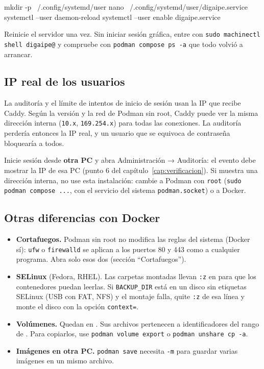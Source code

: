 \begin{codigo}
mkdir -p ~/.config/systemd/user
nano ~/.config/systemd/user/digaipe.service
systemctl --user daemon-reload
systemctl --user enable digaipe.service
\end{codigo}

\begin{comprobar}
	Reinicie el servidor una vez. Sin iniciar sesión gráfica, entre con
	\texttt{sudo machinectl shell digaipe@} y compruebe con \texttt{podman compose ps -a} que todo
	volvió a arrancar.
\end{comprobar}

\subsection{IP real de los usuarios}
\label{sec:podman-ip}

La auditoría y el límite de intentos de inicio de sesión usan la IP que recibe Caddy. Según la
versión y la red de Podman sin root, Caddy puede ver la misma dirección interna
(\texttt{10.x}, \texttt{169.254.x}) para todas las conexiones. La auditoría perdería entonces la
IP real, y un usuario que se equivoca de contraseña bloquearía a todos.

\begin{aviso}
	Inicie sesión desde \textbf{otra PC} y abra Administración → Auditoría: el evento debe mostrar
	la IP de esa PC (punto 6 del capítulo~\ref{cap:verificacion}). Si muestra una dirección
	interna, no use esta instalación: cambie a Podman con \texttt{root}
	(\texttt{sudo podman compose ...}, con el servicio del sistema \texttt{podman.socket}) o a
	Docker.
\end{aviso}

\subsection{Otras diferencias con Docker}

\begin{itemize}
	\item \textbf{Cortafuegos.} Podman sin root no modifica las reglas del sistema (Docker sí):
	      \texttt{ufw} o \texttt{firewalld} se aplican a los puertos 80 y 443 como a cualquier
	      programa. Abra solo esos dos (sección ``Cortafuegos'').
	\item \textbf{SELinux} (Fedora, RHEL). Las carpetas montadas llevan \texttt{:z} en
	       para que los contenedores puedan leerlas. Si \texttt{BACKUP\_DIR}
	      está en un disco sin etiquetas SELinux (USB con FAT, NFS) y el montaje falla, quite
	      \texttt{:z} de esa línea y monte el disco con la opción \texttt{context=}.
	\item \textbf{Volúmenes.} Quedan en
	      . Sus archivos pertenecen a
	      identificadores del rango de . Para copiarlos, use
	      \texttt{podman volume export} o \texttt{podman unshare cp -a}.
	\item \textbf{Imágenes en otra PC.} \texttt{podman save} necesita \texttt{-m} para guardar
	      varias imágenes en un mismo archivo.
\end{itemize}

